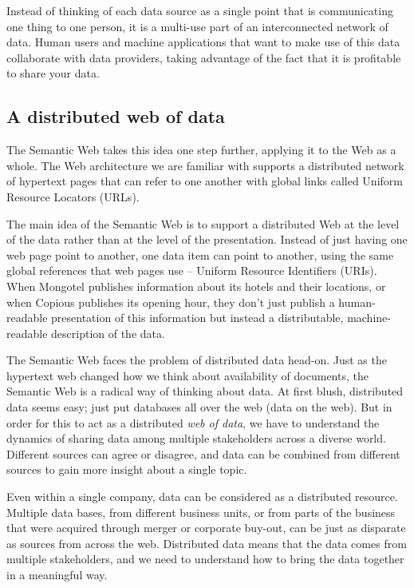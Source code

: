 Instead of thinking of each data source as a single point that is communicating one thing 
to one person, it is a multi-use part of an interconnected network of data.   Human users and 
machine applications that want to make use of this data collaborate with data providers, taking 
advantage of the fact that it is profitable to share your data.

\subsection{A distributed web of data}




The Semantic Web takes this idea one step further, applying it to the
Web as a whole. The Web architecture we are familiar with supports a distributed
network of hypertext pages that can refer to one another with global links
called Uniform Resource Locators (URLs). 

The main idea of the Semantic Web is to support a distributed Web at the
level of the data rather than at the level of the presentation. Instead
of just having one web page point to another, one data item can point to
another, using the same global references that web pages use -- Uniform
Resource Identifiers (URIs).   When Mongotel publishes information about its hotels and
their locations, or when Copious publishes its opening hour, they don't
just publish a human-readable presentation
of this information but instead a distributable, machine-readable
description of the data. 

The Semantic Web faces the problem of distributed data head-on.  Just as 
the hypertext web changed how we think about availability of documents, 
the Semantic Web is a radical way of thinking about data.  At first blush,
distributed data seems easy; just put databases all over the web (data on the web).
But in order for this to act as a distributed \emph{web of data},  we have 
to understand the dynamics of sharing data among multiple stakeholders across
a diverse world.   Different sources can agree or disagree, and data  can be 
combined from different sources to gain more insight about a single topic. 

Even within a single company, data can be considered as a distributed resource. Multiple
data bases, from different business units, or from parts of the business that 
were acquired through merger or corporate buy-out, can be just as disparate as 
sources from across the web.  Distributed data means that the data comes from 
multiple stakeholders, and we need to understand how to bring the data together
in a meaningful way.


